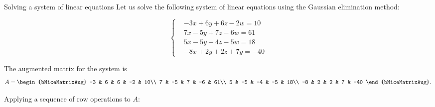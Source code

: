 \begin{example}{Solving a system of linear equations}{}
	Let us solve the following system of linear equations using the Gaussian elimination method:

	\[
		\begin{cases}
		& -3x+6y+6z-2w = 10\\
		& 7x-5y+7z-6w = 61\\
		& 5x-5y-4z-5w = 18\\
		& -8x+2y+2z+7y = -40
		\end{cases}
	\]

	The augmented matrix for the system is
	\[
		A =
		\begin{bNiceMatrixAug}
			-3 &  6 &  6 & -2 &  10\\
			 7 & -5 &  7 & -6 &  61\\
			 5 & -5 & -4 & -5 &  18\\
			-8 &  2 &  2 &  7 & -40
		\end{bNiceMatrixAug}.
	\]

	Applying a sequence of row operations to $A$:


\end{example}
